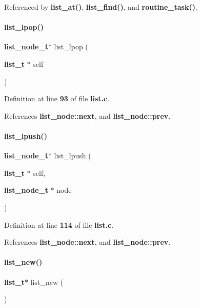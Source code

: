 Referenced by \textbf{ list\+\_\+at()}, \textbf{ list\+\_\+find()}, and \textbf{ routine\+\_\+task()}.

\mbox{\label{list_8h_a97f6f9590b1cdedd5367b9139e9cc4ef}} 
\paragraph{list\+\_\+lpop()}
{\footnotesize\ttfamily \textbf{ list\+\_\+node\+\_\+t}$\ast$ list\+\_\+lpop (\begin{DoxyParamCaption}\item[{\textbf{ list\+\_\+t} $\ast$}]{self }\end{DoxyParamCaption})}



Definition at line \textbf{ 93} of file \textbf{ list.\+c}.



References \textbf{ list\+\_\+node\+::next}, and \textbf{ list\+\_\+node\+::prev}.

\mbox{\label{list_8h_a7e1b077416813dd474a54826347f7502}} 
\paragraph{list\+\_\+lpush()}
{\footnotesize\ttfamily \textbf{ list\+\_\+node\+\_\+t}$\ast$ list\+\_\+lpush (\begin{DoxyParamCaption}\item[{\textbf{ list\+\_\+t} $\ast$}]{self,  }\item[{\textbf{ list\+\_\+node\+\_\+t} $\ast$}]{node }\end{DoxyParamCaption})}



Definition at line \textbf{ 114} of file \textbf{ list.\+c}.



References \textbf{ list\+\_\+node\+::next}, and \textbf{ list\+\_\+node\+::prev}.

\mbox{\label{list_8h_a9dd3eafdb56dcc64689f78fb4acdff3f}} 
\paragraph{list\+\_\+new()}
{\footnotesize\ttfamily \textbf{ list\+\_\+t}$\ast$ list\+\_\+new (\begin{DoxyParamCaption}{ }\end{DoxyParamCaption})}



